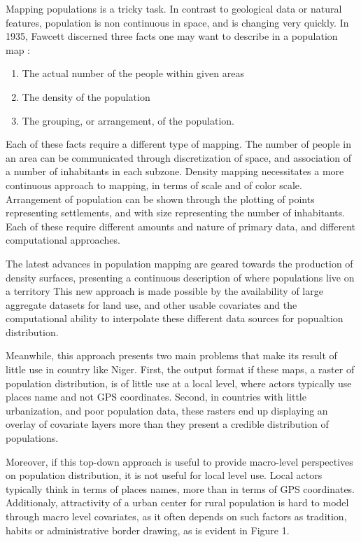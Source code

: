 \documentclass[12pt]{article}\usepackage[]{graphicx}\usepackage[]{color}
\begin{document}
Mapping populations is a tricky task. In contrast to geological data or natural features, population is non continuous in space, and is changing very quickly. In 1935, Fawcett discerned three facts one may want to describe in a population map\cite{fawcett1935population} :
\begin{enumerate}
	\item The actual number of the people within given areas
	\item The density of the population
	\item The grouping, or arrangement, of the population.
\end{enumerate}
Each of these facts require a different type of mapping. The number of people in an area can be communicated through discretization of space, and association of a number of inhabitants in each subzone. Density mapping necessitates a more continuous approach to mapping, in terms of scale and of color scale. Arrangement of population can be shown through the plotting of points representing settlements, and with size representing the number of inhabitants. Each of these require different amounts and nature of primary data, and different computational approaches.

The latest advances in population mapping are geared towards the production of density surfaces, presenting a continuous description of where populations live on a territory%
This new approach is made possible by the availability of large aggregate datasets for land use, and other usable covariates%
 and the computational ability to interpolate these  different data sources for popualtion distribution\cite{stevens2015disaggregating}.

Meanwhile, this approach presents two main problems that make its result of little use in country like Niger. First, the output format if these maps, a raster of population distribution, is of little use at a local level, where actors typically use places name and not GPS coordinates. Second, in countries with little urbanization, and poor population data, these rasters end up displaying an overlay of covariate layers more than they present a credible distribution of populations.

Moreover, if this top-down approach is useful to provide macro-level perspectives on population distribution, it is not useful for local level use. Local actors typically think in terms of places names, more than in terms of GPS coordinates. Additionaly, attractivity of a urban center for rural population is hard to model through macro level covariates, as it often depends on such factors as tradition, habits or administrative border drawing, as is evident in Figure 1.
\end{document}
